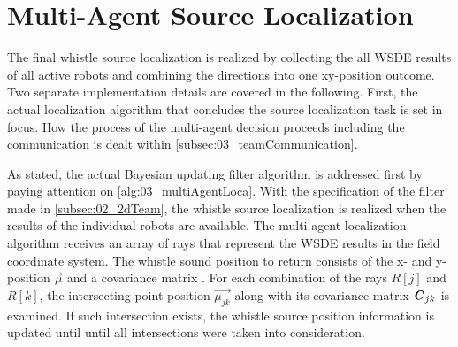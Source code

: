 \section{Multi-Agent Source Localization}
\label{sec:03_multiAgentLoca}

The final whistle source localization is realized by collecting the
all \ac{WSDE} results of all active robots and combining the directions
into one xy-position outcome.
Two separate implementation details are covered in the following.
First, the actual localization algorithm that concludes the source localization
task is set in focus.
How the process of the multi-agent decision proceeds including the communication
is dealt within \cref{subsec:03_teamCommunication}.

As stated, the actual Bayesian updating filter algorithm is addressed first
by paying attention on \cref{alg:03_multiAgentLoca}.
With the specification of the filter made in \cref{subsec:02_2dTeam}, the
whistle source localization is realized when the results of the individual robots
are available.
The multi-agent localization algorithm receives an array of rays that represent
the \ac{WSDE} results in the field coordinate system.
The whistle sound position to return consists of the x- and y-position $\vec{\mu}$ and
a covariance matrix .
For each combination of the rays $R[j]$ and $R[k]$, the intersecting point position
$\vec{\mu_{jk}}$ along with its covariance matrix $\textbf{\textit{C}}_{jk}$ is examined.
If such intersection exists, the whistle source position information is updated until
until all intersections were taken into consideration.


